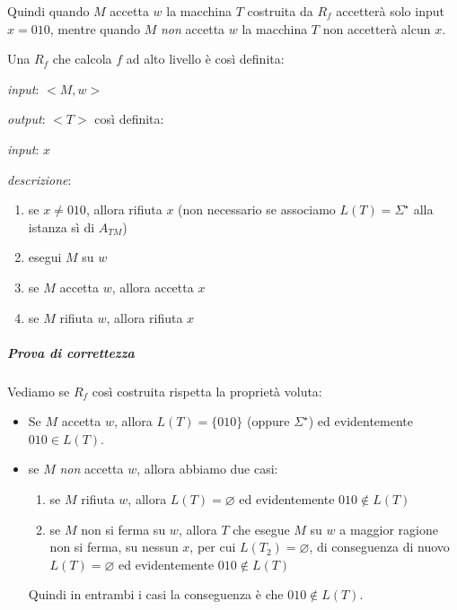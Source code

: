 Quindi quando $M$ accetta $w$ la macchina $T$ costruita da $R_f$ accetterà solo input $x = 010$, mentre quando $M$ \textit{non} accetta $w$ la macchina $T$ non accetterà alcun $x$.

Una $R_f$ che calcola $f$ ad alto livello è così definita:

\begin{description}
\item \textit{input}: $<M, w>$
\item \textit{output}: $<T>$ così definita:
\begin{description}
	\item \textit{input}: $x$
	\item \textit{descrizione}:
	\begin{enumerate}
	\item se $x \neq 010$, allora rifiuta $x$ (non necessario se associamo $L(T) = \Sigma^{\star}$ alla istanza sì di $A_{TM}$)
	\item esegui $M$ su $w$
	\item se $M$ accetta $w$, allora accetta $x$
	\item se $M$ rifiuta $w$, allora rifiuta $x$
	\end{enumerate}
\end{description}
\end{description}

\subparagraph{Prova di correttezza}

Vediamo se $R_f$ così costruita rispetta la proprietà voluta:

\begin{itemize}
\item Se $M$ accetta $w$, allora $L(T) = \{010\}$ (oppure $\Sigma^{\star}$) ed evidentemente $010 \in L(T)$.

\item se $M$ \textit{non} accetta $w$, allora abbiamo due casi:
\begin{enumerate}
\item se $M$ rifiuta $w$, allora $L(T) = \varnothing$ ed evidentemente $010 \notin L(T)$

\item se $M$ non si ferma su $w$, allora $T$ che esegue $M$ su $w$ a maggior ragione non si ferma, su nessun $x$, per cui $L(T_2) = \varnothing$, di conseguenza di nuovo $L(T) = \varnothing$ ed evidentemente $010 \notin L(T)$
\end{enumerate}
Quindi in entrambi i casi la conseguenza è che $010 \notin L(T)$.
\end{itemize}